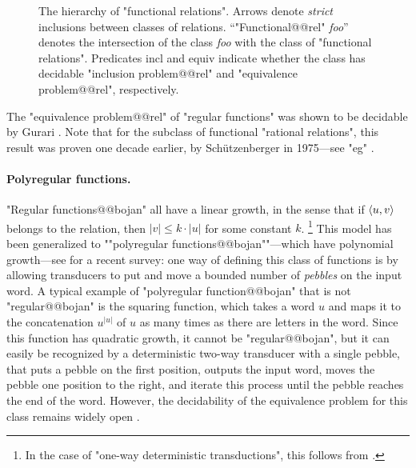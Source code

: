 \begin{figure}
	\caption{
		\AP\label{fig:hierarchy-functional-relations}
		The hierarchy of "functional relations". Arrows denote \emph{strict} inclusions
		between classes of relations.
		``"Functional@@rel" \emph{foo}'' denotes the intersection of the class
		\emph{foo} with the class of "functional relations".
		Predicates \textsf{incl} and \textsf{equiv} indicate
		whether the class has decidable
		"inclusion problem@@rel" and "equivalence problem@@rel", respectively.
	}
\end{figure}

The "equivalence problem@@rel" of "regular functions"
was shown to be decidable by Gurari \cite[Theorem~1]{Gurari1982Equivalence}.
Note that for the subclass of functional "rational relations", this result was proven one decade earlier, by Schützenberger in 1975---see "eg" \cite[Corollary~IV.1.3]{Berstel1979Transductions}.

\paragraph*{Polyregular functions.}
"Regular functions@@bojan" all have a linear growth, in the sense that
if $\langle u,v\rangle$ belongs to the relation, then $|v| \leq k\cdot |u|$
for some constant $k$.%
\footnote{In the case of "one-way deterministic transductions", this follows from
\cite[Theorem~V.4.2]{Sakarovitch2009Elements}.}
This model has been generalized to \AP""polyregular
functions@@bojan""---which have polynomial growth---see \cite{Bojanczyk2022Transducers} for
a recent survey: one way of defining this class of functions is by allowing transducers
to put and move a bounded number of \emph{pebbles} on the input word.
A typical example of "polyregular function@@bojan" that is not "regular@@bojan"
is the squaring function, which takes a word $u$ and maps it to
the concatenation $u^{|u|}$ of $u$ as many times as there are letters in the word.
Since this function has quadratic growth, it cannot be "regular@@bojan", but
it can easily be recognized by a deterministic two-way transducer with a single pebble,
that puts a pebble on the first position, outputs the input word, moves
the pebble one position to the right, and iterate this process until the pebble reaches
the end of the word.
However, the decidability of the equivalence problem for this class remains widely open
\cite[\S~8]{Bojanczyk2022Transducers}.

